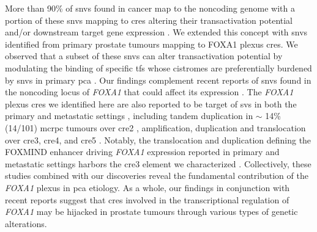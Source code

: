 More than 90\% of \glspl{snv} found in cancer map to the noncoding genome \cite{meltonRecurrentSomaticMutations2015,mazrooeiCistromePartitioningReveals2019} with a portion of these \glspl{snv} mapping to \glspl{cre} altering their transactivation potential \cite{baileyNoncodingSomaticInherited2016,zhangIntegrativeFunctionalGenomics2012,huangHighlyRecurrentTERT2013,hornTERTPromoterMutations2013} and/or downstream target gene expression \cite{zhouEmergenceNoncodingCancer2016,meltonRecurrentSomaticMutations2015,weinholdGenomewideAnalysisNoncoding2014}.
We extended this concept with \glspl{snv} identified from primary prostate tumours mapping to FOXA1 plexus \glspl{cre}.
We observed that a subset of these \glspl{snv} can alter transactivation potential by modulating the binding of specific \glspl{tf} whose cistromes are preferentially burdened by \glspl{snv} in primary \gls{pca} \cite{mazrooeiCistromePartitioningReveals2019}.
Our findings complement recent reports of \glspl{snv} found in the noncoding locus of \emph{FOXA1} that could affect its expression \cite{annalaFrequentMutationFOXA12018,camcapstudygroupSequencingProstateCancers2018}.
The \emph{FOXA1} plexus \glspl{cre} we identified here are also reported to be target of \glspl{sv} in both the primary and metastatic settings \cite{paroliaDistinctStructuralClasses2019,quigleyGenomicHallmarksStructural2018}, including tandem duplication in $\sim$ 14\% (14/101) \gls{mcrpc} tumours over \gls{cre}2 \cite{quigleyGenomicHallmarksStructural2018}, amplification, duplication and translocation over \gls{cre}3, \gls{cre}4, and \gls{cre}5 \cite{paroliaDistinctStructuralClasses2019}.
Notably, the translocation and duplication defining the FOXMIND enhancer driving \emph{FOXA1} expression reported in primary and metastatic settings harbors the \gls{cre}3 element we characterized \cite{paroliaDistinctStructuralClasses2019}.
Collectively, these studies combined with our discoveries reveal the fundamental contribution of the \emph{FOXA1} plexus in \gls{pca} etiology.
As a whole, our findings in conjunction with recent reports suggest that \glspl{cre} involved in the transcriptional regulation of \emph{FOXA1} may be hijacked in prostate tumours through various types of genetic alterations.

